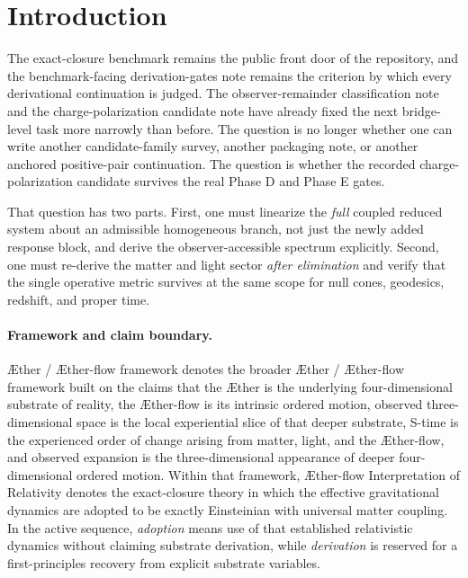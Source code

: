 \documentclass[11pt]{article}
\newcommand{\Aether}{\AE{}ther}
\newcommand{\Aflow}{\AE{}ther-flow}
\newcommand{\TheoryName}{\Aflow{} Interpretation of Relativity}
\newcommand{\TheoryProgram}{\Aether{} / \Aflow{} framework}
\begin{document}
\begin{abstract}
This note still does not claim the controlled GR-limit theorem or the final residual-sector verdict. Its positive result is narrower and exactly the one now required: the concrete charge-polarization candidate passes the full infrared-spectrum gate and the universal matter/light-coupling gate at current admissible-branch scope, so only the controlled GR-limit and residual-sector classifications remain as the next primary derivational manuscripts.
\end{abstract}

\section{Introduction}

The exact-closure benchmark remains the public front door of the repository, and the benchmark-facing derivation-gates note remains the criterion by which every derivational continuation is judged. The observer-remainder classification note and the charge-polarization candidate note have already fixed the next bridge-level task more narrowly than before. The question is no longer whether one can write another candidate-family survey, another packaging note, or another anchored positive-pair continuation. The question is whether the recorded charge-polarization candidate survives the real Phase D and Phase E gates.

That question has two parts. First, one must linearize the \emph{full} coupled reduced system about an admissible homogeneous branch, not just the newly added response block, and derive the observer-accessible spectrum explicitly. Second, one must re-derive the matter and light sector \emph{after elimination} and verify that the single operative metric survives at the same scope for null cones, geodesics, redshift, and proper time.

\paragraph{Framework and claim boundary.}
\TheoryProgram{} denotes the broader \Aether{} / \Aflow{} framework built on the claims that the \Aether{} is the underlying four-dimensional substrate of reality, the \Aflow{} is its intrinsic ordered motion, observed three-dimensional space is the local experiential slice of that deeper substrate, S-time is the experienced order of change arising from matter, light, and the \Aflow{}, and observed expansion is the three-dimensional appearance of deeper four-dimensional ordered motion. Within that framework, \TheoryName{} denotes the exact-closure theory in which the effective gravitational dynamics are adopted to be exactly Einsteinian with universal matter coupling. In the active sequence, \emph{adoption} means use of that established relativistic dynamics without claiming substrate derivation, while \emph{derivation} is reserved for a first-principles recovery from explicit substrate variables.
\end{document}
